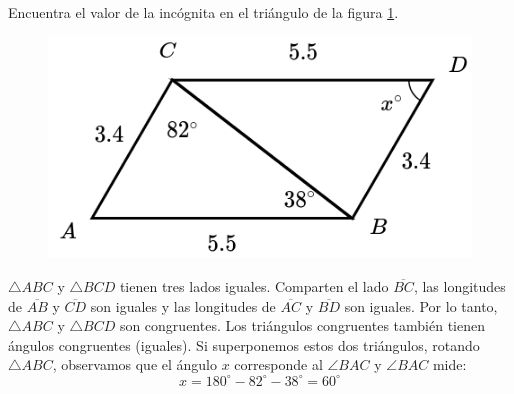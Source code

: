 Encuentra el valor de la incógnita en el triángulo de la figura \ref{fig:angle_triangle_36}.

\begin{minipage}[t][][t]{0.35\textwidth}
    \begin{figure}[H]
        \centering
        \includegraphics[width=0.9\linewidth]{../images/angle_triangle_36.png}
        \caption{}
        \label{fig:angle_triangle_36}
    \end{figure}
\end{minipage}\hfill
\begin{minipage}[t][][t]{0.6\textwidth}
    \begin{solutionbox}{4.5cm}
        $\triangle ABC$ y $\triangle BCD$ tienen tres lados iguales. Comparten el lado
        $\overline{BC}$, las longitudes de $\overline{AB}$ y $\overline{CD}$ son iguales y las longitudes de
        $\overline{AC}$ y $\overline{BD}$ son iguales. Por lo tanto,
        $\triangle ABC$ y $\triangle BCD$  son congruentes.
        Los triángulos congruentes también tienen ángulos congruentes (iguales). Si superponemos estos dos triángulos, rotando
        $\triangle ABC$, observamos que el ángulo $x$ corresponde al
        $\angle BAC$ y $\angle BAC$ mide: \[x=180^\circ-82^\circ-38^\circ=60^\circ\]
    \end{solutionbox}
\end{minipage}
